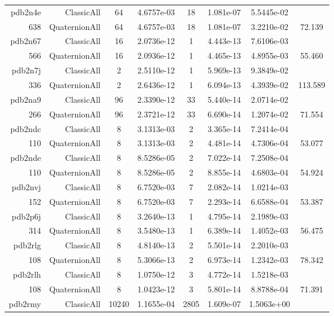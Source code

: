 \begin{xltabular}{\textwidth}{r|rcS[table-format=1.4e+2]cS[table-format=1.3e+2]S[table-format=1.4e+2]S[table-format=-1.3]}
pdb2n4e & ClassicAll & 64 & 4.6757e-03 & 18 & 1.081e-07 & 5.5445e-02 & \\
638 & QuaternionAll & 64 & 4.6757e-03 & 18 & 1.081e-07 & 3.2210e-02 & 72.139\\  \addlinespace
pdb2n67 & ClassicAll & 16 & 2.0736e-12 & 1 & 4.443e-13 & 7.6106e-03 & \\
566 & QuaternionAll & 16 & 2.0936e-12 & 1 & 4.465e-13 & 4.8955e-03 & 55.460\\  \addlinespace
pdb2n7j & ClassicAll & 2 & 2.5110e-12 & 1 & 5.969e-13 & 9.3849e-02 & \\
336 & QuaternionAll & 2 & 2.6436e-12 & 1 & 6.094e-13 & 4.3939e-02 & 113.589\\  \addlinespace
pdb2na9 & ClassicAll & 96 & 2.3390e-12 & 33 & 5.440e-14 & 2.0714e-02 & \\
266 & QuaternionAll & 96 & 2.3721e-12 & 33 & 6.690e-14 & 1.2074e-02 & 71.554\\  \addlinespace
pdb2ndc & ClassicAll & 8 & 3.1313e-03 & 2 & 3.365e-14 & 7.2414e-04 & \\
110 & QuaternionAll & 8 & 3.1313e-03 & 2 & 4.481e-14 & 4.7306e-04 & 53.077\\  \addlinespace
pdb2nde & ClassicAll & 8 & 8.5286e-05 & 2 & 7.022e-14 & 7.2508e-04 & \\
110 & QuaternionAll & 8 & 8.5286e-05 & 2 & 8.855e-14 & 4.6803e-04 & 54.924\\  \addlinespace
pdb2nvj & ClassicAll & 8 & 6.7520e-03 & 7 & 2.082e-14 & 1.0214e-03 & \\
152 & QuaternionAll & 8 & 6.7520e-03 & 7 & 2.293e-14 & 6.6588e-04 & 53.387\\  \addlinespace
pdb2p6j & ClassicAll & 8 & 3.2640e-13 & 1 & 4.795e-14 & 2.1989e-03 & \\
314 & QuaternionAll & 8 & 3.5480e-13 & 1 & 6.389e-14 & 1.4052e-03 & 56.475\\  \addlinespace
pdb2rlg & ClassicAll & 8 & 4.8140e-13 & 2 & 5.501e-14 & 2.2010e-03 & \\
108 & QuaternionAll & 8 & 5.3066e-13 & 2 & 6.973e-14 & 1.2342e-03 & 78.342\\  \addlinespace
pdb2rlh & ClassicAll & 8 & 1.0750e-12 & 3 & 4.772e-14 & 1.5218e-03 & \\
108 & QuaternionAll & 8 & 1.0423e-12 & 3 & 5.801e-14 & 8.8788e-04 & 71.391\\  \addlinespace
pdb2rmy & ClassicAll & 10240 & 1.1655e-04 & 2805 & 1.609e-07 & 1.5063e+00 & \\

\end{xltabular}

